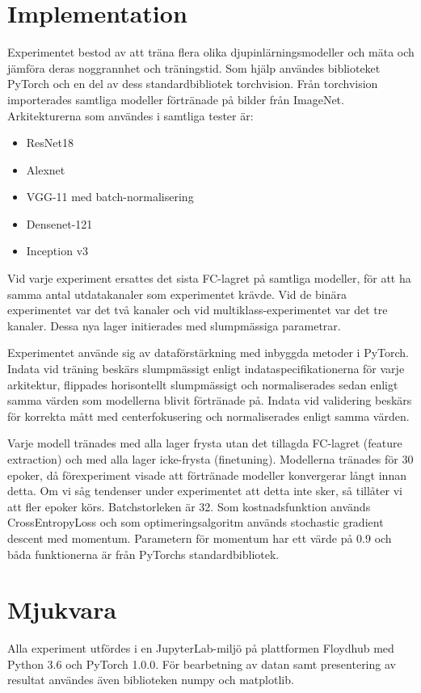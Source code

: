 \documentclass[]{kththesis}
\begin{document}
\section{Implementation}
Experimentet bestod av att träna flera olika djupinlärningsmodeller och mäta och jämföra deras noggrannhet och träningstid. Som hjälp användes biblioteket PyTorch \parencite{paszke2017automatic} och en del av dess standardbibliotek torchvision. Från torchvision importerades samtliga modeller förtränade på bilder från ImageNet. Arkitekturerna som användes i samtliga tester är:
\begin{itemize}
  \item ResNet18
  \item Alexnet
  \item VGG-11 med batch-normalisering
  \item Densenet-121
  \item Inception v3
\end{itemize}

Vid varje experiment ersattes det sista FC-lagret på samtliga modeller, för att ha samma antal utdatakanaler som experimentet krävde. Vid de binära experimentet var det två kanaler och vid multiklass-experimentet var det tre kanaler. Dessa nya lager initierades med slumpmässiga parametrar.

Experimentet använde sig av dataförstärkning med inbyggda metoder i PyTorch. Indata vid träning beskärs slumpmässigt enligt indataspecifikationerna för varje arkitektur, flippades horisontellt slumpmässigt och normaliserades sedan enligt samma värden som modellerna blivit förtränade på. Indata vid validering beskärs för korrekta mått med centerfokusering och normaliserades enligt samma värden.

Varje modell tränades med alla lager frysta utan det tillagda FC-lagret (feature extraction) och med alla lager icke-frysta (finetuning). Modellerna tränades för 30 epoker, då förexperiment visade att förtränade modeller konvergerar långt innan detta. Om vi såg tendenser under experimentet att detta inte sker, så tillåter vi att fler epoker körs. Batchstorleken är 32. Som kostnadsfunktion används CrossEntropyLoss och som optimeringsalgoritm används stochastic gradient descent med momentum. Parametern för momentum har ett värde på 0.9 och båda funktionerna är från PyTorchs standardbibliotek.

\section{Mjukvara}
Alla experiment utfördes i en JupyterLab-miljö på plattformen Floydhub \parencite{floydhub} med Python 3.6 och PyTorch 1.0.0. För bearbetning av datan samt presentering av resultat användes även biblioteken numpy och matplotlib.
\end{document}
